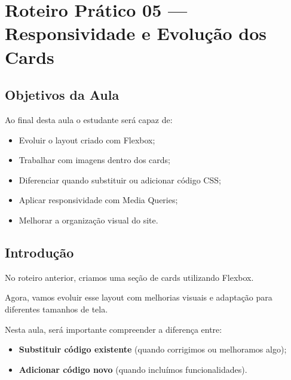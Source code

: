 \documentclass[12pt,a4paper]{article}
\begin{document}
\newpage






\section{Roteiro Prático 05 — Responsividade e Evolução dos Cards}


\subsection{Objetivos da Aula}

\begin{boxObjetivos}
Ao final desta aula o estudante será capaz de:

\begin{itemize}
\item Evoluir o layout criado com Flexbox;
\item Trabalhar com imagens dentro dos cards;
\item Diferenciar quando substituir ou adicionar código CSS;
\item Aplicar responsividade com Media Queries;
\item Melhorar a organização visual do site.
\end{itemize}
\end{boxObjetivos}


\subsection{Introdução}

No roteiro anterior, criamos uma seção de cards utilizando Flexbox.

Agora, vamos evoluir esse layout com melhorias visuais e adaptação para diferentes tamanhos de tela.

Nesta aula, será importante compreender a diferença entre:

\begin{itemize}
\item \textbf{Substituir código existente} (quando corrigimos ou melhoramos algo);
\item \textbf{Adicionar código novo} (quando incluímos funcionalidades).
\end{itemize}
\end{document}

